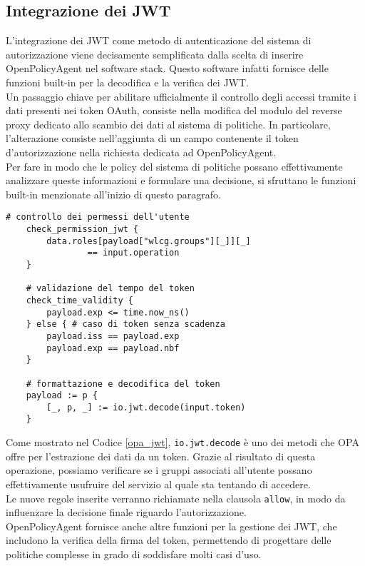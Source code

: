 \subsection{Integrazione dei JWT}
L'integrazione dei JWT come metodo di autenticazione del sistema di autorizzazione viene decisamente semplificata
dalla scelta di inserire OpenPolicyAgent nel software stack. 
Questo software infatti fornisce delle funzioni built-in per la decodifica e la verifica dei JWT.
\\ Un passaggio chiave per abilitare ufficialmente il controllo degli accessi tramite i dati presenti nei token OAuth, 
consiste nella modifica del modulo del reverse proxy dedicato allo scambio dei dati al sistema di politiche. In particolare, l'alterazione consiste 
nell'aggiunta di un campo contenente il token d'autorizzazione nella richiesta dedicata ad OpenPolicyAgent.
\\ Per fare in modo che le policy del sistema di politiche possano effettivamente analizzare queste informazioni e formulare una decisione, 
si sfruttano le funzioni built-in menzionate all'inizio di questo paragrafo. 
\begin{lstlisting}[caption={Esempio di regole per la gestione dei token OAuth 2.0},captionpos=b,label=opa_jwt]
    # controllo dei permessi dell'utente
    check_permission_jwt {
        data.roles[payload["wlcg.groups"][_]][_]
                == input.operation
    }
    
    # validazione del tempo del token 
    check_time_validity {
        payload.exp <= time.now_ns()
    } else { # caso di token senza scadenza
        payload.iss == payload.exp
        payload.exp == payload.nbf
    }
    
    # formattazione e decodifica del token
    payload := p {
        [_, p, _] := io.jwt.decode(input.token)
    }
\end{lstlisting}
Come mostrato nel Codice \ref{opa_jwt}, \texttt{io.jwt.decode} è uno dei metodi che OPA offre per l'estrazione dei dati da un token.
Grazie al risultato di questa operazione, possiamo verificare se i gruppi associati all'utente possano effettivamente usufruire del servizio al quale sta tentando di accedere.
\\ Le nuove regole inserite verranno richiamate nella clausola \texttt{allow}, in modo da influenzare la decisione finale riguardo l'autorizzazione. 
\\ OpenPolicyAgent fornisce anche altre funzioni per la gestione dei JWT, che includono la verifica della firma del token, 
permettendo di progettare delle politiche complesse in grado di soddisfare molti casi d'uso. 

